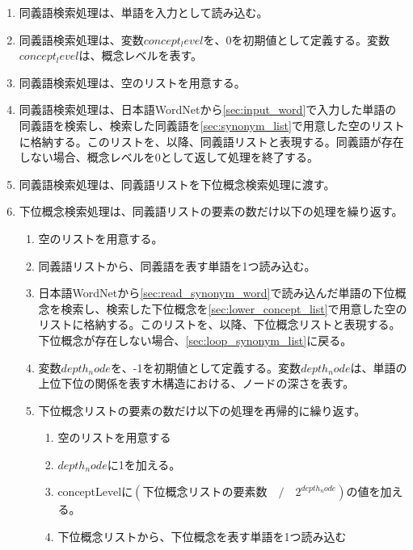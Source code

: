 \begin{enumerate}
    \item 同義語検索処理は、単語を入力として読み込む。
    \label{sec:input_word}
    \item 同義語検索処理は、変数$concept_level$を、0を初期値として定義する。変数$concept_level$は、概念レベルを表す。
    \item 同義語検索処理は、空のリストを用意する。
    \label{sec:synonym_list}
    \item 同義語検索処理は、日本語WordNetから\ref{sec:input_word}で入力した単語の同義語を検索し、検索した同義語を\ref{sec:synonym_list}で用意した空のリストに格納する。このリストを、以降、同義語リストと表現する。同義語が存在しない場合、概念レベルを0として返して処理を終了する。
    \item 同義語検索処理は、同義語リストを下位概念検索処理に渡す。
    \item 下位概念検索処理は、同義語リストの要素の数だけ以下の処理を繰り返す。
    \label{sec:loop_synonym_list}
        \begin{enumerate}
            \item 空のリストを用意する。
            \label{sec:lower_concept_list}
            \item 同義語リストから、同義語を表す単語を1つ読み込む。
            \label{sec:read_synonym_word}
            \item 日本語WordNetから\ref{sec:read_synonym_word}で読み込んだ単語の下位概念を検索し、検索した下位概念を\ref{sec:lower_concept_list}で用意した空のリストに格納する。このリストを、以降、下位概念リストと表現する。下位概念が存在しない場合、\ref{sec:loop_synonym_list}に戻る。
            \item 変数$depth_node$を、-1を初期値として定義する。変数$depth_node$は、単語の上位下位の関係を表す木構造における、ノードの深さを表す。
            \item 下位概念リストの要素の数だけ以下の処理を再帰的に繰り返す。
            \label{sec:loop_lower_list}
                \begin{enumerate}
                    \item 空のリストを用意する
                    \label{sec:lower_concept_list2}
                    \item $depth_node$に1を加える。
                    \item conceptLevelに$(下位概念リストの要素数\quad/\quad2^{depth_node})$の値を加える。
                    \item 下位概念リストから、下位概念を表す単語を1つ読み込む

\end{enumerate}
\end{enumerate}
\end{enumerate}
